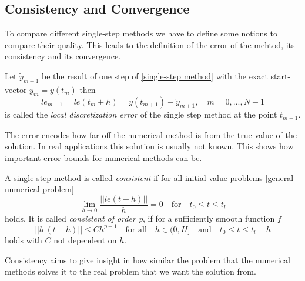 	\subsection{Consistency and Convergence}
	
	To compare different single-step methods we have to define some notions to compare their quality. This leads to the definition of the error of the mehtod, its consistency and its convergence.
	
	\begin{definition}
		Let $\tilde{y}_{m+1}$ be the result of one step of \ref{single-step method} with the exact start-vector $y_m = y(t_m)$ then
		\begin{equation}
			\label{local discretization error single step}
			le_{m+1} = le(t_m+h) = y(t_{m+1}) - \tilde{y}_{m+1}, \quad m = 0,...,N-1
		\end{equation}
		is called the \emph{local discretization error} of the single step method at the point $t_{m+1}$.
	\end{definition}

	The error encodes how far off the numerical method is from the true value of the solution. In real applications this solution is usually not known. This shows how important error bounds for numerical methods can be.

	\begin{definition}
		A single-step method is called \emph{consistent} if for all initial value problems \ref{general numerical problem} 
		\begin{equation}
			\lim\limits_{h \to 0} \frac{||le(t+h)||}{h} = 0 \quad \text{for} \quad t_0 \leq t \leq t_l
		\end{equation}
		holds.\newline
		It is called \emph{consistent of order p}, if for a sufficiently smooth function $f$
		\begin{equation}
			||le(t+h)|| \leq Ch^{p+1} \quad \text{for all} \quad h \in \mathopen{(} 0,H \mathclose{]} \quad \text{and} \quad t_0 \leq t \leq t_l - h
		\end{equation}
		holds with $C$ not dependent on $h$.
	\end{definition}

	Consistency aims to give insight in how similar the problem that the numerical methods solves it to the real problem that we want the solution from.

